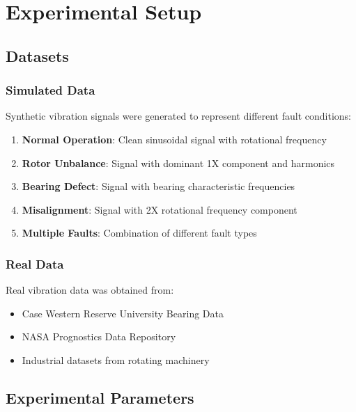\section{Experimental Setup}

\subsection{Datasets}

\subsubsection{Simulated Data}

Synthetic vibration signals were generated to represent different fault conditions:

\begin{enumerate}
    \item \textbf{Normal Operation}: Clean sinusoidal signal with rotational frequency
    \item \textbf{Rotor Unbalance}: Signal with dominant 1X component and harmonics
    \item \textbf{Bearing Defect}: Signal with bearing characteristic frequencies
    \item \textbf{Misalignment}: Signal with 2X rotational frequency component
    \item \textbf{Multiple Faults}: Combination of different fault types
\end{enumerate}

\subsubsection{Real Data}

Real vibration data was obtained from:

\begin{itemize}
    \item Case Western Reserve University Bearing Data
    \item NASA Prognostics Data Repository
    \item Industrial datasets from rotating machinery
\end{itemize}

\subsection{Experimental Parameters}

